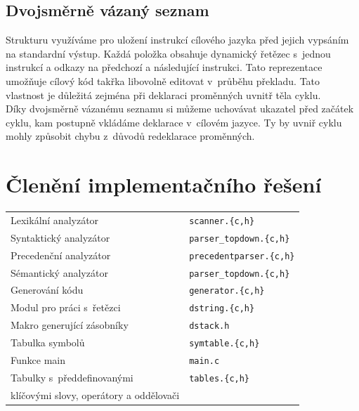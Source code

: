 \documentclass[11pt]{article}
\begin{document}
    \subsection{Dvojsměrně vázaný seznam}
    \label{sec:dll}

        Strukturu využíváme pro uložení instrukcí cílového jazyka před jejich vypsáním na
        standardní výstup. Každá položka obsahuje dynamický řetězec s~jednou
        instrukcí a odkazy na předchozí a následující instrukci. Tato reprezentace umožňuje
        cílový kód takřka libovolně editovat v~průběhu překladu. Tato vlastnost je důležitá
        zejména při deklaraci proměnných uvnitř těla cyklu. \\
        \indent Díky dvojsměrně vázanému seznamu si můžeme uchovávat ukazatel před začátek
        cyklu, kam postupně vkládáme deklarace v~cílovém jazyce. Ty by uvniř cyklu mohly
        způsobit chybu z~důvodů redeklarace proměnných.
        
        
    \section{Členění implementačního řešení}
        \begin{tabular}{l   l}
            Lexikální analyzátor & \; \verb|scanner.{c,h}| \\
            Syntaktický analyzátor & \; \verb|parser_topdown.{c,h}| \\ 
            Precedenční analyzátor & \; \verb|precedentparser.{c,h}| \\
            Sémantický analyzátor & \; \verb|parser_topdown.{c,h}| \\
            Generování kódu & \; \verb|generator.{c,h}| \\
            Modul pro práci s~řetězci & \; \verb|dstring.{c,h}| \\
            Makro generující zásobníky & \; \verb|dstack.h| \\
            Tabulka symbolů & \; \verb|symtable.{c,h}| \\
            Funkce main & \; \verb|main.c|\\
            Tabulky s~předdefinovanými & \; \verb|tables.{c,h}|\\
            klíčovými slovy, operátory a oddělovači & \\
        \end{tabular}
    \vspace{10mm}
\end{document}
